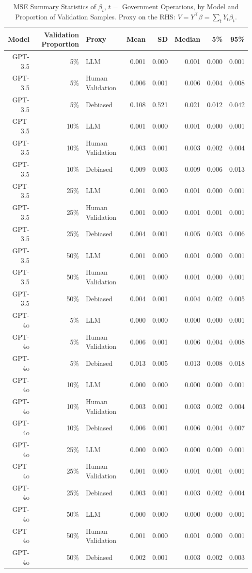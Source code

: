 \begin{table}

\caption{\label{tab:unnamed-chunk-1}MSE Summary Statistics of $\beta_{t}$, $t=$ Government Operations, by Model and Proportion of Validation Samples.
      Proxy on the RHS: $V = Y^\top \beta = \sum_{t} Y_t \beta_t$.}
\centering
\begin{tabular}[t]{rrlrrrrr}
\toprule
Model & Validation Proportion & Proxy & Mean & SD & Median & 5\% & 95\%\\
\midrule
GPT-3.5 & 5\% & LLM & 0.001 & 0.000 & 0.001 & 0.000 & 0.001\\
GPT-3.5 & 5\% & Human Validation & 0.006 & 0.001 & 0.006 & 0.004 & 0.008\\
GPT-3.5 & 5\% & Debiased & 0.108 & 0.521 & 0.021 & 0.012 & 0.042\\
GPT-3.5 & 10\% & LLM & 0.001 & 0.000 & 0.001 & 0.000 & 0.001\\
GPT-3.5 & 10\% & Human Validation & 0.003 & 0.001 & 0.003 & 0.002 & 0.004\\
GPT-3.5 & 10\% & Debiased & 0.009 & 0.003 & 0.009 & 0.006 & 0.013\\
GPT-3.5 & 25\% & LLM & 0.001 & 0.000 & 0.001 & 0.000 & 0.001\\
GPT-3.5 & 25\% & Human Validation & 0.001 & 0.000 & 0.001 & 0.001 & 0.001\\
GPT-3.5 & 25\% & Debiased & 0.004 & 0.001 & 0.005 & 0.003 & 0.006\\
GPT-3.5 & 50\% & LLM & 0.001 & 0.000 & 0.001 & 0.000 & 0.001\\
GPT-3.5 & 50\% & Human Validation & 0.001 & 0.000 & 0.001 & 0.000 & 0.001\\
GPT-3.5 & 50\% & Debiased & 0.004 & 0.001 & 0.004 & 0.002 & 0.005\\
GPT-4o & 5\% & LLM & 0.000 & 0.000 & 0.000 & 0.000 & 0.001\\
GPT-4o & 5\% & Human Validation & 0.006 & 0.001 & 0.006 & 0.004 & 0.008\\
GPT-4o & 5\% & Debiased & 0.013 & 0.005 & 0.013 & 0.008 & 0.018\\
GPT-4o & 10\% & LLM & 0.000 & 0.000 & 0.000 & 0.000 & 0.001\\
GPT-4o & 10\% & Human Validation & 0.003 & 0.001 & 0.003 & 0.002 & 0.004\\
GPT-4o & 10\% & Debiased & 0.006 & 0.001 & 0.006 & 0.004 & 0.007\\
GPT-4o & 25\% & LLM & 0.000 & 0.000 & 0.000 & 0.000 & 0.001\\
GPT-4o & 25\% & Human Validation & 0.001 & 0.000 & 0.001 & 0.001 & 0.001\\
GPT-4o & 25\% & Debiased & 0.003 & 0.001 & 0.003 & 0.002 & 0.004\\
GPT-4o & 50\% & LLM & 0.000 & 0.000 & 0.000 & 0.000 & 0.001\\
GPT-4o & 50\% & Human Validation & 0.001 & 0.000 & 0.001 & 0.000 & 0.001\\
GPT-4o & 50\% & Debiased & 0.002 & 0.001 & 0.003 & 0.002 & 0.003\\
\bottomrule
\end{tabular}
\end{table}
